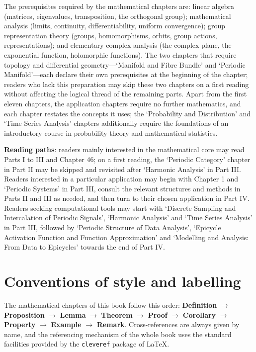 The prerequisites required by the mathematical chapters are: linear algebra (matrices, eigenvalues, transposition, the orthogonal group); mathematical analysis (limits, continuity, differentiability, uniform convergence); group representation theory (groups, homomorphisms, orbits, group actions, representations); and elementary complex analysis (the complex plane, the exponential function, holomorphic functions). The two chapters that require topology and differential geometry---`Manifold and Fibre Bundle' and `Periodic Manifold'---each declare their own prerequisites at the beginning of the chapter; readers who lack this preparation may skip these two chapters on a first reading without affecting the logical thread of the remaining parts. Apart from the first eleven chapters, the application chapters require no further mathematics, and each chapter restates the concepts it uses; the `Probability and Distribution' and `Time Series Analysis' chapters additionally require the foundations of an introductory course in probability theory and mathematical statistics.

\textbf{Reading paths}: readers mainly interested in the mathematical core may read Parts I to III and Chapter 46; on a first reading, the `Periodic Category' chapter in Part II may be skipped and revisited after `Harmonic Analysis' in Part III. Readers interested in a particular application may begin with Chapter 1 and `Periodic Systems' in Part III, consult the relevant structures and methods in Parts II and III as needed, and then turn to their chosen application in Part IV. Readers seeking computational tools may start with `Discrete Sampling and Intercalation of Periodic Signals', `Harmonic Analysis' and `Time Series Analysis' in Part III, followed by `Periodic Structure of Data Analysis', `Epicycle Activation Function and Function Approximation' and `Modelling and Analysis: From Data to Epicycles' towards the end of Part IV.

\section*{Conventions of style and labelling}

The mathematical chapters of this book follow this order: \textbf{Definition} $\to$ \textbf{Proposition} $\to$ \textbf{Lemma} $\to$ \textbf{Theorem} $\to$ \textbf{Proof} $\to$ \textbf{Corollary} $\to$ \textbf{Property} $\to$ \textbf{Example} $\to$ \textbf{Remark}. Cross-references are always given by name, and the referencing mechanism of the whole book uses the standard facilities provided by the \texttt{cleveref} package of \LaTeX{}.

